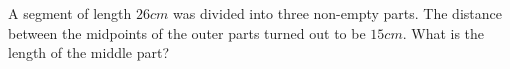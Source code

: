 A segment of length $26cm$ was divided into three non-empty parts. The distance between the midpoints of the outer parts turned out to be $15cm$. What is the length of the middle part?
